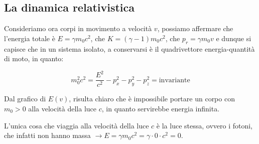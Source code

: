 \subsection{La dinamica relativistica}

Consideriamo ora corpi in movimento a velocità $v$, possiamo affermare che l'energia totale è $E = \gamma m_0 c^2$, che $K = (\gamma - 1) m_0 c^2$, che $p_r = \gamma m_0 v$  e dunque si capisce che in un sistema isolato, a conservarsi è il quadrivettore energia-quantità di moto, in quanto:

\begin{equation*}
    m_0^2 c^2 = \frac{E^2}{c^2} - p_x^2 - p_y^2 - p_z^2 = \text{invariante}
\end{equation*}

Dal grafico di $E(v)$, risulta chiaro che è impossibile portare un corpo con $m_0 > 0$ alla velocità della luce $c$, in quanto servirebbe energia infinita.

L'unica cosa che viaggia alla velocità della luce $c$ è la luce stessa, ovvero i fotoni, che infatti non hanno massa $\rightarrow E = \gamma m_0 c^2 = \gamma \cdot 0 \cdot c^2 = 0$.

